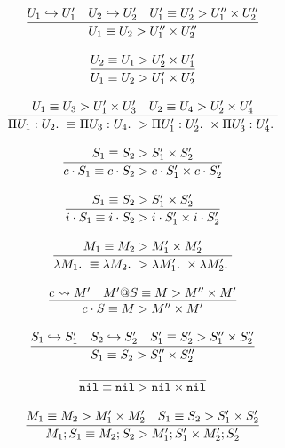 $$
\begin{array}{c}
\infer{\LzEquiv{U_1}{U_2}{U_1''}{U_2''}}{U_1\Weak U_1' & U_2\Weak U_2' & \LzEquiv{U_1'}{U_2'}{U_1''}{U_2''}}\\\\
\infer{\LzEquiv{U_1}{U_2}{U_1'}{U_2'}}{\LzEquiv{U_2}{U_1}{U_2'}{U_1'}} \\\\
\infer{\LzEquiv{\PiTyp{U_1}{U_2}}{\PiTyp{U_3}{U_4}}{\PiTyp{U_1'}{U_2'}}{\PiTyp{U_3'}{U_4'}}}{\LzEquiv{U_1}{U_3}{U_1'}{U_3'} & \LzEquiv{U_2}{U_4}{U_2'}{U_4'}} \\\\
\infer{\LzEquiv{c\cdot S_1}{c\cdot S_2}{c\cdot S_1'}{c\cdot S_2'}}{\LzEquiv{S_1}{S_2}{S_1'}{S_2'}} \\\\
\infer{\LzEquiv{i\cdot S_1}{i\cdot S_2}{i\cdot S_1'}{i\cdot S_2'}}{\LzEquiv{S_1}{S_2}{S_1'}{S_2'}} \\\\
\infer{\LzEquiv{\Lam{M_1}}{\Lam{M_2}}{\Lam{M_1'}}{\Lam{M_2'}}}{\LzEquiv{M_1}{M_2}{M_1'}{M_2'}} \\\\
\infer{\LzEquiv{c\cdot S}{M}{M''}{M'}}{c\StepsTo M' & \LzEquiv{M'@S}{M}{M''}{M'}} 
\end{array} 
$$

\bigskip 
{}
\bigskip 

$$
\begin{array}{c}
\infer{\LzEquiv{S_1}{S_2}{S_1''}{S_2''}}{S_1\Weak S_1' & S_2\Weak S_2' & \LzEquiv{S_1'}{S_2'}{S_1''}{S_2''}}\\\\
\infer{\LzEquiv{\Nil}{\Nil}{\Nil}{\Nil}}{}\\\\
\infer{\LzEquiv{M_1;S_1}{M_2;S_2}{M_1';S_1'}{M_2';S_2'}}{\LzEquiv{M_1}{M_2}{M_1'}{M_2'} & \LzEquiv{S_1}{S_2}{S_1'}{S_2'}} \\\\
\end{array} 
$$

